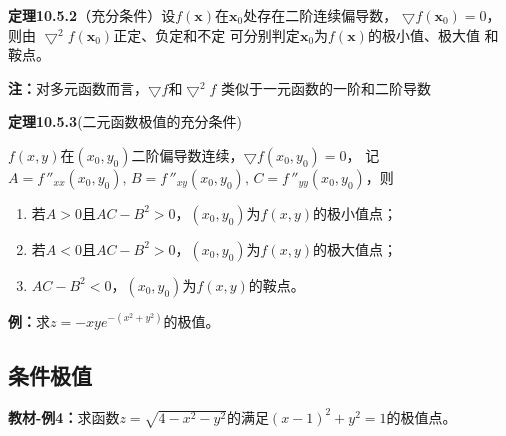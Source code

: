 {\bf 定理10.5.2}（充分条件）设$f(\bm{x})$在$\bm{x}_0$处存在二阶连续偏导数，
$\bigtriangledown f(\bm{x}_0)=0$，则由
$\bigtriangledown^2 f(\bm{x}_0)$正定、负定和不定
可分别判定$\bm{x}_0$为$f(\bm{x})$的极小值、极大值
和鞍点。

{\bf 注：}对多元函数而言，$\bigtriangledown f$和$\bigtriangledown^2 f$
类似于一元函数的一阶和二阶导数

{\bf 定理10.5.3}(二元函数极值的充分条件)

$f(x,y)$在$(x_0,y_0)$二阶偏导数连续，$\bigtriangledown f(x_0,y_0)=0$，
记$A=f\,''_{xx}(x_0,y_0),\,B=f\,''_{xy}(x_0,y_0),\,C=f\,''_{yy}(x_0,y_0)$，则
\begin{enumerate}[(1)]
  \setlength{\itemindent}{1cm}
  \item 若$A>0$且$AC-B^2>0$，$(x_0,y_0)$为$f(x,y)$的极小值点；
  \item 若$A<0$且$AC-B^2>0$，$(x_0,y_0)$为$f(x,y)$的极大值点；
  \item $AC-B^2<0$，$(x_0,y_0)$为$f(x,y)$的鞍点。
\end{enumerate}

{\bf 例：}求$z=-xye^{-(x^2+y^2)}$的极值。

\subsection{条件极值}

{\bf 教材-例4：}求函数$z=\sqrt{4-x^2-y^2}$的满足$(x-1)^2+y^2=1$的极值点。

\begin{center}
\end{center}

